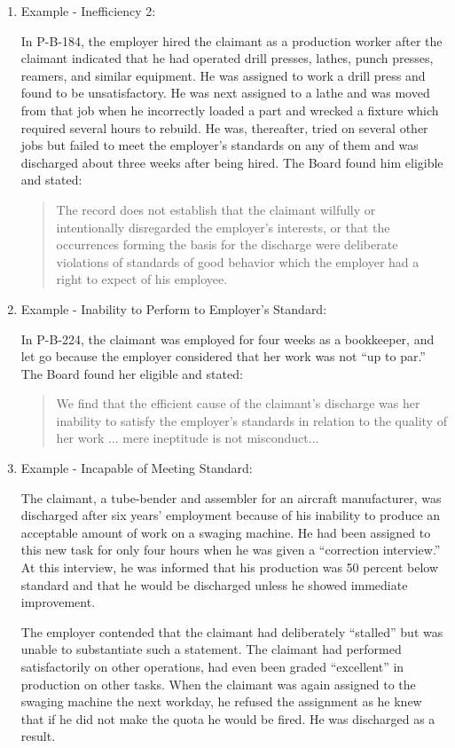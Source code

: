 \documentclass[12pt]{article}
\newcommand{\1}{\mathbf{1}}
\begin{document}
\begin{appendix}
\begin{enumerate}
\item Example - Inefficiency 2:

In P-B-184, the employer hired the claimant as a production worker after the claimant indicated that he had operated drill presses, lathes, punch presses, reamers, and similar equipment. He was assigned to work a drill press and found to be unsatisfactory. He was next assigned to a lathe and was moved from that job when he incorrectly loaded a part and wrecked a fixture which required several hours to rebuild. He was, thereafter, tried on several other jobs but failed to meet the employer's standards on any of them and was discharged about three weeks after being hired. The Board found him eligible and stated:
\begin{quotation}
The record does not establish that the claimant wilfully or intentionally disregarded the employer's interests, or that the occurrences forming the basis for the discharge were deliberate violations of standards of good behavior which the employer had a right to expect of his employee.
\end{quotation}

\item Example - Inability to Perform to Employer's Standard:

In P-B-224, the claimant was employed for four weeks as a bookkeeper, and let go because the employer considered that her work was not ``up to par.'' The Board found her eligible and stated:
\begin{quotation}
We find that the efficient cause of the claimant's discharge was her inability to satisfy the employer's standards in relation to the quality of her work ... mere ineptitude is not misconduct...
\end{quotation}

\item Example - Incapable of Meeting Standard:

The claimant, a tube-bender and assembler for an aircraft manufacturer, was discharged after six years' employment because of his inability to produce an acceptable amount of work on a swaging machine. He had been assigned to this new task for only four hours when he was given a ``correction interview.'' At this interview, he was informed that his production was 50 percent below standard and that he would be discharged unless he showed immediate improvement.

The employer contended that the claimant had deliberately ``stalled'' but was unable to substantiate such a statement. The claimant had performed satisfactorily on other operations, had even been graded ``excellent'' in production on other tasks. When the claimant was again assigned to the swaging machine the next workday, he refused the assignment as he knew that if he did not make the quota he would be fired. He was discharged as a result.


\end{enumerate}
\end{appendix}
\end{document}
